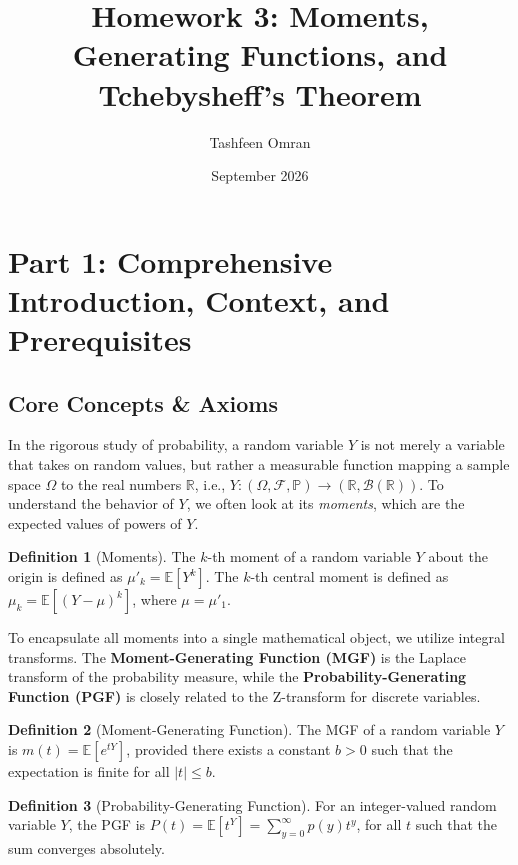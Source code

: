\documentclass[11pt, a4paper]{article}
\title{\textbf{Homework 3: Moments, Generating Functions, and Tchebysheff's Theorem}}
\author{Tashfeen Omran}
\date{September 2026}
\theoremstyle{definition}
\newtheorem{definition}{Definition}[section]
\theoremstyle{remark}
\newcommand{\E}{\mathbb{E}}
\newcommand{\Prob}{\mathbb{P}}
\newcommand{\R}{\mathbb{R}}
\newcommand{\F}{\mathcal{F}}
\begin{document}
\maketitle
\tableofcontents
\newpage

\section{Part 1: Comprehensive Introduction, Context, and Prerequisites}

\subsection{Core Concepts \& Axioms}
In the rigorous study of probability, a random variable $Y$ is not merely a variable that takes on random values, but rather a measurable function mapping a sample space $\Omega$ to the real numbers $\R$, i.e., $Y: (\Omega, \F, \Prob) \to (\R, \mathcal{B}(\R))$. To understand the behavior of $Y$, we often look at its \textit{moments}, which are the expected values of powers of $Y$. 

\begin{definition}[Moments]
The $k$-th moment of a random variable $Y$ about the origin is defined as $\mu'_k = \E[Y^k]$. The $k$-th central moment is defined as $\mu_k = \E[(Y - \mu)^k]$, where $\mu = \mu'_1$.
\end{definition}

To encapsulate all moments into a single mathematical object, we utilize integral transforms. The \textbf{Moment-Generating Function (MGF)} is the Laplace transform of the probability measure, while the \textbf{Probability-Generating Function (PGF)} is closely related to the Z-transform for discrete variables.

\begin{definition}[Moment-Generating Function]
The MGF of a random variable $Y$ is $m(t) = \E[e^{tY}]$, provided there exists a constant $b > 0$ such that the expectation is finite for all $|t| \le b$.
\end{definition}

\begin{definition}[Probability-Generating Function]
For an integer-valued random variable $Y$, the PGF is $P(t) = \E[t^Y] = \sum_{y=0}^\infty p(y) t^y$, for all $t$ such that the sum converges absolutely.
\end{definition}
\end{document}

